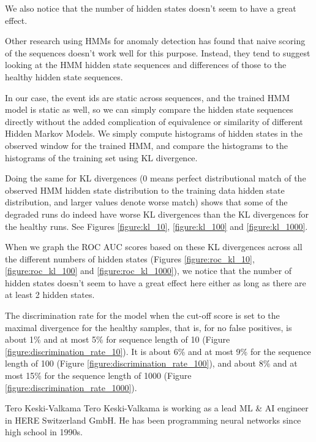 \documentclass[journal]{IEEEtran}
\begin{document}
We also notice that the number of hidden states doesn't seem to have a great effect.

Other research using HMMs for anomaly detection has found that naive scoring of the sequences doesn't work well for this purpose\cite{gornitz2015hidden}. Instead, they tend to suggest looking at the HMM hidden state sequences and differences of those to the healthy hidden state sequences.

In our case, the event ids are static across sequences, and the trained HMM model is static as well, so we can simply compare the hidden state sequences directly without the added complication of equivalence or similarity of different Hidden Markov Models. We simply compute histograms of hidden states in the observed window for the trained HMM, and compare the histograms to the histograms of the training set using KL divergence.

Doing the same for KL divergences (0 means perfect distributional match of the observed HMM hidden state distribution to the training data hidden state distribution, and larger values denote worse match) shows that some of the degraded runs do indeed have worse KL divergences than the KL divergences for the healthy runs. See Figures \ref{figure:kl_10}, \ref{figure:kl_100} and \ref{figure:kl_1000}.

When we graph the ROC AUC scores based on these KL divergences across all the different numbers of hidden states (Figures \ref{figure:roc_kl_10}, \ref{figure:roc_kl_100} and \ref{figure:roc_kl_1000}), we notice that the number of hidden states doesn't seem to have a great effect here either as long as there are at least 2 hidden states.

The discrimination rate for the model when the cut-off score is set to the maximal divergence for the healthy samples, that is, for no false positives, is about 1\% and at most 5\% for sequence length of 10 (Figure \ref{figure:discrimination_rate_10}). It is about 6\% and at most 9\% for the sequence length of 100 (Figure \ref{figure:discrimination_rate_100}), and about 8\% and at most 15\% for the sequence length of 1000 (Figure \ref{figure:discrimination_rate_1000}).





\begin{IEEEbiography}{Tero Keski-Valkama}
Tero Keski-Valkama is working as a lead ML \& AI engineer in HERE Switzerland GmbH. He has been programming neural networks since high school in 1990s.
\end{IEEEbiography}
\end{document}
